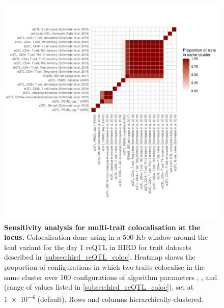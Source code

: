 \begin{figure}
    \centering
    \includegraphics[width=1.0\textwidth,page=1]{mainmatter/figures/chapter_03/perform_coloc.gene_ENSG00000138031.sensitivityPlot_custom.pdf}
    \caption{
        \textbf{Sensitivity analysis for multi-trait colocalisation at the  locus.}
        Colocalisation done using  \autocite{foley2019FastEfficientColocalization} in a 500 Kb window around the lead variant for the day 1  \gls{reQTL} in \gls{HIRD} for trait datasets described in \cref{subsec:hird_reQTL_coloc}.
        Heatmap shows the proportion of configurations in which two traits colocalise in the same cluster over 100 configurations of algorithm parameters
        , , and  (range of values listed in \cref{subsec:hird_reQTL_coloc}).
         set at \num{1e-4} (default).
        Rows and columns hierarchically-clustered.
    }
    \label{fig:hird_reQTL_coloc_ADCY3_sensitivityPlotCustom}
\end{figure}

